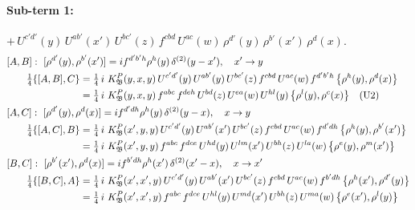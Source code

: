 \documentclass[10pt]{article}
\numberwithin{equation}{section}
\begin{document}
\paragraph{Sub-term 1:} $+\,U^{c'd'}(y)\,U^{ab'}(x')\,U^{bc'}(z)\,f^{cbd}\,U^{ac}(w)\,\rho^{d'}(y)\,\rho^{b'}(x')\,\rho^{d}(x)$.
\begin{align}
&[A,B]:\ [\rho^{d'}(y),\rho^{b'}(x')]=i f^{d'b'h}\rho^{h}(y)\,\delta^{(2)}(y-x'),\quad x'\to y\notag\\
&\qquad \tfrac14\{[A,B],C\}=\tfrac14\,i\,\,K^{P}_{\mathfrak B}(y,x,y)\,U^{c'd'}(y)\,U^{ab'}(y)\,U^{bc'}(z)\,f^{cbd}\,U^{ac}(w)\,f^{d'b'h}\,\big\{\rho^{h}(y),\rho^{d}(x)\big\}\notag\\
&\qquad\phantom{\tfrac14\{[A,B],C\}}=\tfrac14\,i\,\,K^{P}_{\mathfrak B}(y,x,y)\,f^{abc}\,f^{deh}\,U^{bd}(z)\,U^{ea}(w)\,U^{hl}(y)\,\big\{\rho^{l}(y),\rho^{c}(x)\big\}\quad\text{(U2)}
\label{B:eq:GIII.II.P-1-AB}\\
&[A,C]:\ [\rho^{d'}(y),\rho^{d}(x)]=i f^{d'dh}\rho^{h}(y)\,\delta^{(2)}(y-x),\quad x\to y\notag\\
&\qquad \tfrac14\{[A,C],B\}=\tfrac14\,i\,\,K^{P}_{\mathfrak B}(x',y,y)\,U^{c'd'}(y)\,U^{ab'}(x')\,U^{bc'}(z)\,f^{cbd}\,U^{ac}(w)\,f^{d'dh}\,\big\{\rho^{h}(y),\rho^{b'}(x')\big\}\notag\\
&\qquad\phantom{\tfrac14\{[A,C],B\}}=\tfrac14\,i\,\,K^{P}_{\mathfrak B}(x',y,y)\,f^{abc}\,f^{dce}\,U^{hd}(y)\,U^{lm}(x')\,U^{bh}(z)\,U^{la}(w)\,\big\{\rho^{e}(y),\rho^{m}(x')\big\}
\label{B:eq:GIII.II.P-1-AC}\\
&[B,C]:\ [\rho^{b'}(x'),\rho^{d}(x)]=i f^{b'dh}\rho^{h}(x')\,\delta^{(2)}(x'-x),\quad x\to x'\notag\\
&\qquad \tfrac14\{[B,C],A\}=\tfrac14\,i\,\,K^{P}_{\mathfrak B}(x',x',y)\,U^{c'd'}(y)\,U^{ab'}(x')\,U^{bc'}(z)\,f^{cbd}\,U^{ac}(w)\,f^{b'dh}\,\big\{\rho^{h}(x'),\rho^{d'}(y)\big\}\notag\\
&\qquad\phantom{\tfrac14\{[B,C],A\}}=\tfrac14\,i\,\,K^{P}_{\mathfrak B}(x',x',y)\,f^{abc}\,f^{dce}\,U^{hl}(y)\,U^{md}(x')\,U^{bh}(z)\,U^{ma}(w)\,\big\{\rho^{e}(x'),\rho^{l}(y)\big\}
\label{B:eq:GIII.II.P-1-BC}
\end{align}
\end{document}

